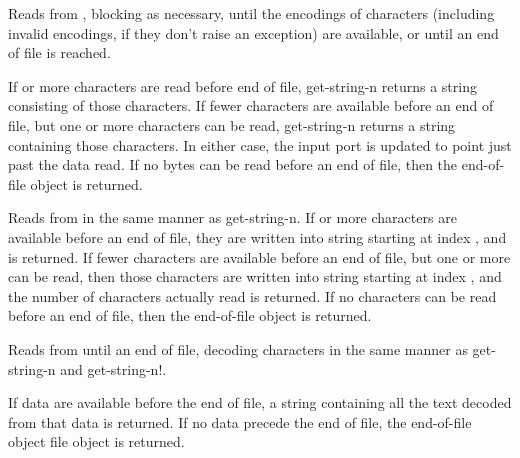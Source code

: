 \begin{entry}{%
}
   
Reads from , blocking as necessary, until the
encodings of  characters (including invalid encodings, if they
don't raise an exception) are available, or until an end of
file is reached.
   
If  or more characters are read before end of file, {\cf
  get-string-n} returns a string consisting of those 
characters. If fewer characters are available before an end of file,
but one or more characters can be read, {\cf get-string-n} returns a string containing
those characters. In either case, the input port is updated to point
just past the data read. If no bytes can be read before an 
end of file, then the end-of-file object is returned.
\end{entry}

\begin{entry}{%
}


Reads from  in the same manner as {\cf
  get-string-n}.  If  or more characters are available
before an end of file, they are written into string
starting at index , and  is returned. If fewer
characters are available before an end of file, but one
or more can be read, then those characters are written into string
starting at index , and the number of characters actually read is
returned. If no characters can be read before an end of file,
then the end-of-file object is returned.
\end{entry}   

\begin{entry}{%
}
   
Reads from  until an end of file, decoding
characters in the same manner as {\cf get-string-n} and {\cf get-string-n!}.
   
If data are available before the end of file, a string
containing all the text decoded from that data is returned. If no data
precede the end of file, the end-of-file object file object is
returned.
\end{entry}

